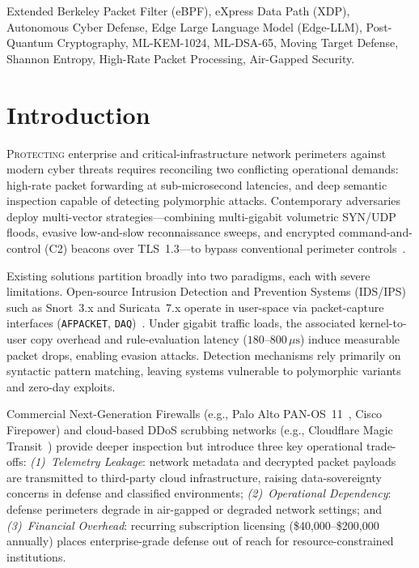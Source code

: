 \documentclass{ieeeaccess}
\renewcommand{\_}{\textunderscore\allowbreak}
\begin{document}
\begin{keywords}
Extended Berkeley Packet Filter (eBPF), eXpress Data Path (XDP),
Autonomous Cyber Defense, Edge Large Language Model (Edge-LLM),
Post-Quantum Cryptography, ML-KEM-1024, ML-DSA-65, Moving Target Defense,
Shannon Entropy, High-Rate Packet Processing, Air-Gapped Security.
\end{keywords}

\titlepgskip=-15pt

\maketitle

\section{Introduction}
\lettrine[lines=3,loversize=0.08,findent=2pt,nindent=0pt]{P}{rotecting} enterprise
and critical-infrastructure network perimeters against modern cyber threats requires
reconciling two conflicting operational demands: high-rate packet forwarding at sub-microsecond
latencies, and deep semantic inspection capable of detecting polymorphic attacks.
Contemporary adversaries deploy multi-vector strategies---combining multi-gigabit volumetric
SYN/UDP floods, evasive low-and-slow reconnaissance sweeps, and encrypted command-and-control
(C2) beacons over TLS~1.3---to bypass conventional perimeter
controls~\cite{sarhan2022standard,mirsky2018kitsune}.

Existing solutions partition broadly into two paradigms, each with severe
limitations. Open-source Intrusion Detection and Prevention Systems (IDS/IPS)
such as Snort~3.x and Suricata~7.x operate in user-space via packet-capture
interfaces (\texttt{AF\_PACKET}, \texttt{DAQ})~\cite{roesch1999snort}. Under
gigabit traffic loads, the associated kernel-to-user copy overhead and
rule-evaluation latency ($180$--$800\,\mu\text{s}$) induce measurable packet
drops, enabling evasion attacks. Detection mechanisms rely primarily on
syntactic pattern matching, leaving systems vulnerable to polymorphic variants
and zero-day exploits.

Commercial Next-Generation Firewalls (e.g., Palo Alto
PAN-OS~11~\cite{paloalto2024panos}, Cisco Firepower) and cloud-based DDoS
scrubbing networks (e.g., Cloudflare Magic
Transit~\cite{cloudflare2024magic}) provide deeper inspection but introduce
three key operational trade-offs: \emph{(1)~Telemetry Leakage}: network
metadata and decrypted packet payloads are transmitted to third-party cloud
infrastructure, raising data-sovereignty concerns in defense and classified
environments; \emph{(2)~Operational Dependency}: defense perimeters degrade
in air-gapped or degraded network settings; and \emph{(3)~Financial
Overhead}: recurring subscription licensing
(\$40{,}000--\$200{,}000 annually) places enterprise-grade defense out of
reach for resource-constrained institutions.
\end{document}
